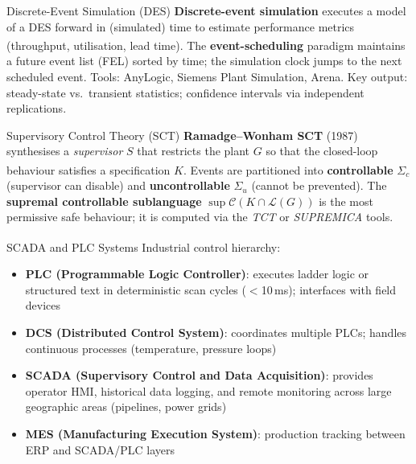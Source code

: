 \begin{v3topic}{Discrete-Event Simulation (DES)}
    \textbf{Discrete-event simulation} executes a model of a DES forward in (simulated) time to estimate performance metrics (throughput, utilisation, lead time)\textsuperscript{\cite[][pp.~360--400]{cassandrasIntroductionDiscreteEvent2009}}.
    The \textbf{event-scheduling} paradigm maintains a future event list (FEL) sorted by time; the simulation clock jumps to the next scheduled event.
    Tools: AnyLogic, Siemens Plant Simulation, Arena.
    Key output: steady-state vs.\ transient statistics; confidence intervals via independent replications.

\end{v3topic}
\begin{v3topic}{Supervisory Control Theory (SCT)}
    \textbf{Ramadge--Wonham SCT} (1987) synthesises a \emph{supervisor} $S$ that restricts the plant $G$ so that the closed-loop behaviour satisfies a specification $K$\textsuperscript{\cite[][pp.~250--256]{liuSupervisoryControlTheory2019}}.
    Events are partitioned into \textbf{controllable} $\Sigma_c$ (supervisor can disable) and \textbf{uncontrollable} $\Sigma_u$ (cannot be prevented).
    The \textbf{supremal controllable sublanguage} $\sup\mathcal{C}(K \cap \mathcal{L}(G))$ is the most permissive safe behaviour; it is computed via the \emph{TCT} or \emph{SUPREMICA} tools.

\end{v3topic}
\begin{v3topic}{SCADA and PLC Systems}
    Industrial control hierarchy\textsuperscript{\cite[][pp.~60--80]{manesissIntroductionIndustrialAutomation2020}}:
    \begin{itemize}
        \item \textbf{PLC (Programmable Logic Controller)}: executes ladder logic or structured text in deterministic scan cycles ($<$10\,ms); interfaces with field devices
        \item \textbf{DCS (Distributed Control System)}: coordinates multiple PLCs; handles continuous processes (temperature, pressure loops)
        \item \textbf{SCADA (Supervisory Control and Data Acquisition)}: provides operator HMI, historical data logging, and remote monitoring across large geographic areas (pipelines, power grids)
        \item \textbf{MES (Manufacturing Execution System)}: production tracking between ERP and SCADA/PLC layers
    \end{itemize}
\end{v3topic}

